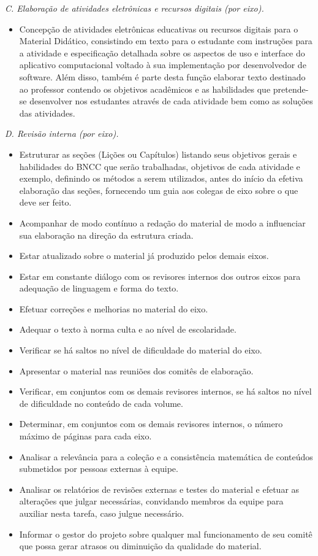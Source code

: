 \documentclass[10 pt]{article}
\begin{document}
{\it C. Elaboração de atividades eletrônicas e recursos digitais (por eixo).}
\begin{itemize}
 \item Concepção de atividades eletrônicas educativas ou recursos digitais para o Material Didático, consistindo em texto para o estudante com instruções para a atividade e especificação detalhada sobre os aspectos de uso e interface do aplicativo computacional voltado à sua implementação por desenvolvedor de software. Além disso, também é parte desta função elaborar texto destinado ao professor contendo os objetivos acadêmicos e as habilidades que pretende-se desenvolver nos estudantes através de cada atividade bem como as soluções das atividades.
\end{itemize}
\vspace{0.2cm}

{\it D. Revisão interna (por eixo).}
\begin{itemize} %
  \item     Estruturar as seções (Lições ou Capítulos) listando seus objetivos gerais e habilidades do BNCC que serão trabalhadas, objetivos de cada atividade e exemplo, definindo os métodos a serem utilizados, antes do início da efetiva elaboração das seções, fornecendo um guia aos colegas de eixo sobre o que deve ser feito.
  \item     Acompanhar de modo contínuo a redação do material de modo a influenciar sua elaboração na direção da estrutura criada.
  \item     Estar atualizado sobre o material já produzido pelos demais eixos.
  \item     Estar em constante diálogo com os revisores internos dos outros eixos para adequação de linguagem e forma do texto.
  \item     Efetuar correções e melhorias no material do eixo.
  \item     Adequar o texto à norma culta e ao nível de escolaridade.
  \item     Verificar se há saltos no nível de dificuldade do material do eixo.
  \item     Apresentar o material nas reuniões dos comitês de elaboração.
  \item     Verificar, em conjuntos com os demais revisores internos, se há saltos no nível de dificuldade no conteúdo de cada volume.
  \item     Determinar, em conjuntos com os demais revisores internos, o número máximo de páginas para cada eixo.
  \item     Analisar a relevância para a coleção e a consistência matemática de conteúdos submetidos por pessoas externas à equipe.
  \item     Analisar os relatórios de revisões externas e testes do material e efetuar as alterações que julgar necessárias, convidando membros da equipe para auxiliar nesta tarefa, caso julgue necessário.
  \item     Informar o gestor do projeto sobre qualquer mal funcionamento de seu comitê que possa gerar atrasos ou diminuição da qualidade do material.
\end{itemize} %
\vspace{0.2cm}
\end{document}
